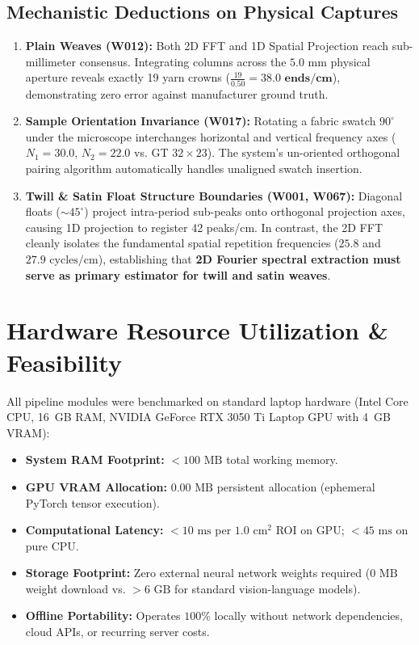 \documentclass[11pt,a4paper]{article}
\begin{document}
\subsection{Mechanistic Deductions on Physical Captures}
\begin{enumerate}
    \item \textbf{Plain Weaves (W012):} Both 2D FFT and 1D Spatial Projection reach sub-millimeter consensus. Integrating columns across the $5.0\text{ mm}$ physical aperture reveals exactly 19 yarn crowns ($\frac{19}{0.50} = \mathbf{38.0\text{ ends/cm}}$), demonstrating zero error against manufacturer ground truth.
    \item \textbf{Sample Orientation Invariance (W017):} Rotating a fabric swatch $90^\circ$ under the microscope interchanges horizontal and vertical frequency axes ($N_1 = 30.0$, $N_2 = 22.0$ vs. GT $32\times 23$). The system's un-oriented orthogonal pairing algorithm automatically handles unaligned swatch insertion.
    \item \textbf{Twill \& Satin Float Structure Boundaries (W001, W067):} Diagonal floats ($\sim 45^\circ$) project intra-period sub-peaks onto orthogonal projection axes, causing 1D projection to register 42 peaks/cm. In contrast, the 2D FFT cleanly isolates the fundamental spatial repetition frequencies ($25.8$ and $27.9\text{ cycles/cm}$), establishing that \textbf{2D Fourier spectral extraction must serve as primary estimator for twill and satin weaves}.
\end{enumerate}

\section{Hardware Resource Utilization \& Feasibility}

All pipeline modules were benchmarked on standard laptop hardware (Intel Core CPU, 16~GB RAM, NVIDIA GeForce RTX 3050 Ti Laptop GPU with 4~GB VRAM):
\begin{itemize}
    \item \textbf{System RAM Footprint:} $< 100\text{ MB}$ total working memory.
    \item \textbf{GPU VRAM Allocation:} $0.00\text{ MB}$ persistent allocation (ephemeral PyTorch tensor execution).
    \item \textbf{Computational Latency:} $< 10\text{ ms}$ per $1.0\text{ cm}^2$ ROI on GPU; $< 45\text{ ms}$ on pure CPU.
    \item \textbf{Storage Footprint:} Zero external neural network weights required ($0\text{ MB}$ weight download vs. $> 6\text{ GB}$ for standard vision-language models).
    \item \textbf{Offline Portability:} Operates $100\%$ locally without network dependencies, cloud APIs, or recurring server costs.
\end{itemize}
\end{document}

